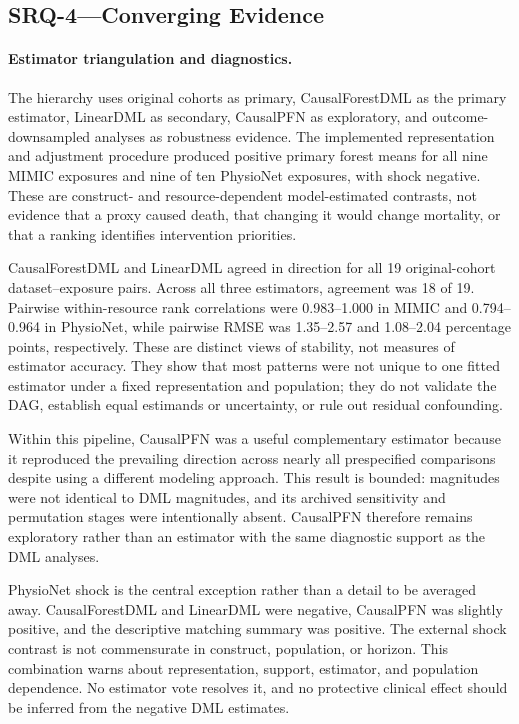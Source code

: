 \subsection{SRQ-4---Converging Evidence}
\label{subsec:discussion:adjusted-effects-agreement}

\paragraph{Estimator triangulation and diagnostics.}
The hierarchy uses original cohorts as primary, CausalForestDML as the primary estimator, LinearDML as secondary, CausalPFN as exploratory, and outcome-downsampled analyses as robustness evidence.  The implemented representation and adjustment procedure produced positive primary forest means for all nine MIMIC exposures and nine of ten PhysioNet exposures, with shock negative.  These are construct- and resource-dependent model-estimated contrasts, not evidence that a proxy caused death, that changing it would change mortality, or that a ranking identifies intervention priorities.

CausalForestDML and LinearDML agreed in direction for all 19 original-cohort dataset--exposure pairs.  Across all three estimators, agreement was 18 of 19.  Pairwise within-resource rank correlations were 0.983--1.000 in MIMIC and 0.794--0.964 in PhysioNet, while pairwise RMSE was 1.35--2.57 and 1.08--2.04 percentage points, respectively.  These are distinct views of stability, not measures of estimator accuracy.  They show that most patterns were not unique to one fitted estimator under a fixed representation and population; they do not validate the DAG, establish equal estimands or uncertainty, or rule out residual confounding.

Within this pipeline, CausalPFN was a useful complementary estimator because it reproduced the prevailing direction across nearly all prespecified comparisons despite using a different modeling approach.  This result is bounded: magnitudes were not identical to DML magnitudes, and its archived sensitivity and permutation stages were intentionally absent.  CausalPFN therefore remains exploratory rather than an estimator with the same diagnostic support as the DML analyses.

PhysioNet shock is the central exception rather than a detail to be averaged away.  CausalForestDML and LinearDML were negative, CausalPFN was slightly positive, and the descriptive matching summary was positive.  The external shock contrast is not commensurate in construct, population, or horizon.  This combination warns about representation, support, estimator, and population dependence.  No estimator vote resolves it, and no protective clinical effect should be inferred from the negative DML estimates.


